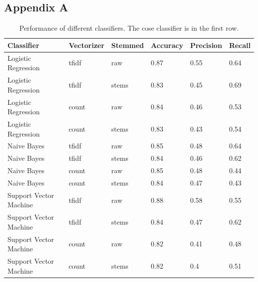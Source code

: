 \subsection*{Appendix A}

\begin{table}[ht!]
\begin{tabular}{|l|l|l|l|l|l|}
\hline
\textbf{Classifier}    & \textbf{Vectorizer} & \textbf{Stemmed} & \textbf{Accuracy} & \textbf{Precision} & \textbf{Recall} \\ \hline
Logistic Regression    & tfidf               & raw              & 0.87              & 0.55               & 0.64            \\ \hline
Logistic Regression    & tfidf               & stems            & 0.83              & 0.45               & 0.69            \\ \hline
Logistic Regression    & count               & raw              & 0.84              & 0.46               & 0.53            \\ \hline
Logistic Regression    & count               & stems            & 0.83              & 0.43               & 0.54            \\ \hline
Naive Bayes            & tfidf               & raw              & 0.85              & 0.48               & 0.64            \\ \hline
Naive Bayes            & tfidf               & stems            & 0.84              & 0.46               & 0.62            \\ \hline
Naive Bayes            & count               & raw              & 0.85              & 0.48               & 0.44            \\ \hline
Naive Bayes            & count               & stems            & 0.84              & 0.47               & 0.43            \\ \hline
Support Vector Machine & tfidf               & raw              & 0.88              & 0.58               & 0.55            \\ \hline
Support Vector Machine & tfidf               & stems            & 0.84              & 0.47               & 0.62            \\ \hline
Support Vector Machine & count               & raw              & 0.82              & 0.41               & 0.48            \\ \hline
Support Vector Machine & count               & stems            & 0.82              & 0.4                & 0.51            \\ \hline
\end{tabular}
\caption{Performance of different classifiers. The cose classifier is in the first row.}
\label{tab:perf}
\end{table}
\newpage 

